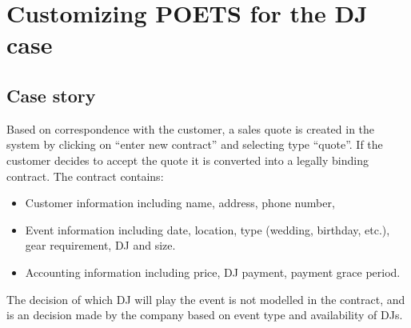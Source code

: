 \documentclass[envcountsame]{llncs}
\begin{document}


\section{Customizing POETS for the DJ case}
\label{sec:build-poets}
\subsection{Case story}
\label{sec:case-story}
Based on correspondence with the customer, a sales quote is created in
the system by clicking on ``enter new contract'' and selecting type
``quote''. If the customer decides to accept the quote it is converted
into a legally binding contract. The contract contains:
\begin{itemize}
\item Customer information including name, address, phone number,
\item Event information including date, location, type (wedding,
  birthday, etc.), gear requirement, DJ and size.
\item Accounting information including price, DJ payment, payment
  grace period.
\end{itemize}
The decision of which DJ will play the event is not modelled in the contract, and is an decision made by the company based on event type and availability of DJs.
\end{document}
